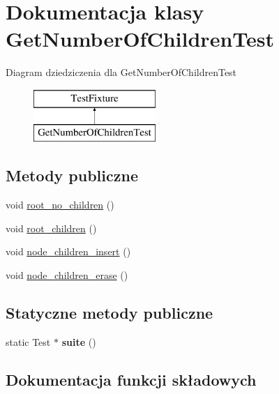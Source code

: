 \hypertarget{class_get_number_of_children_test}{}\section{Dokumentacja klasy Get\+Number\+Of\+Children\+Test}
\label{class_get_number_of_children_test}
Diagram dziedziczenia dla Get\+Number\+Of\+Children\+Test\begin{figure}[H]
\begin{center}
\leavevmode
\includegraphics[height=2.000000cm]{class_get_number_of_children_test}
\end{center}
\end{figure}
\subsection*{Metody publiczne}
\begin{DoxyCompactItemize}
\item 
void \hyperlink{class_get_number_of_children_test_ab43b852fd1b487614fbb1799b54f723a}{root\+\_\+no\+\_\+children} ()
\item 
void \hyperlink{class_get_number_of_children_test_abf650bd374f47d9687109fb0022e5f21}{root\+\_\+children} ()
\item 
void \hyperlink{class_get_number_of_children_test_a0930a6f25c1f9d47424aab20a1733eb3}{node\+\_\+children\+\_\+insert} ()
\item 
void \hyperlink{class_get_number_of_children_test_ab19f7ecb2b671bc44fdfb2947deee52a}{node\+\_\+children\+\_\+erase} ()
\end{DoxyCompactItemize}
\subsection*{Statyczne metody publiczne}
\begin{DoxyCompactItemize}
\item 
\mbox{\label{class_get_number_of_children_test_a348017e90bc30a00737ea03bfb44820d}} 
static Test $\ast$ {\bfseries suite} ()
\end{DoxyCompactItemize}


\subsection{Dokumentacja funkcji składowych}
\mbox{\label{class_get_number_of_children_test_ab19f7ecb2b671bc44fdfb2947deee52a}} 

